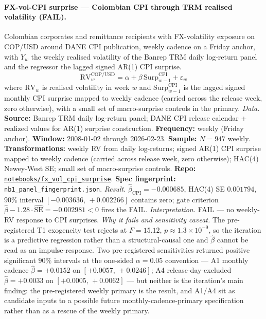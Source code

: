 \paragraph{FX-vol-CPI surprise --- Colombian CPI through TRM realised volatility (FAIL).}
Colombian corporates and remittance recipients with FX-volatility exposure on COP/USD around DANE CPI publication, weekly cadence on a Friday anchor, with \(Y_w\) the weekly realised volatility of the Banrep TRM daily log-return panel and the regressor the lagged signed AR(1) CPI surprise.
\[ \mathrm{RV}^{\mathrm{COP/USD}}_w = \alpha + \beta\, \mathrm{Surp}^{\mathrm{CPI}}_{w-1} + \varepsilon_w \]
where \(\mathrm{RV}_w\) is realised volatility in week \(w\) and \(\mathrm{Surp}^{\mathrm{CPI}}_{w-1}\) is the lagged signed monthly CPI surprise mapped to weekly cadence (carried across the release week, zero otherwise), with a small set of macro-surprise controls in the primary.
\textit{Data.} \textbf{Source:} Banrep TRM daily log-return panel; DANE CPI release calendar + realized values for AR(1) surprise construction. \textbf{Frequency:} weekly (Friday anchor). \textbf{Window:} 2008-01-02 through 2026-02-23. \textbf{Sample:} \(N = 947\) weekly. \textbf{Transformations:} weekly RV from daily log-returns; signed AR(1) CPI surprise mapped to weekly cadence (carried across release week, zero otherwise); HAC(4) Newey-West SE; small set of macro-surprise controls. \textbf{Repo:} \href{https://github.com/JMSBPP/abrigo-analytics/tree/master/notebooks/fx_vol_cpi_surprise}{\texttt{notebooks/fx\_vol\_cpi\_surprise}}. \textbf{Spec fingerprint:} \texttt{nb1\_panel\_fingerprint.json}.
\textit{Result.} \(\hat{\beta}_{\mathrm{CPI}} = -0.000685\), HAC(4) SE \(0.001794\), \(90\%\) interval \([-0.003636,\, +0.002266]\) contains zero; gate criterion \(\hat{\beta} - 1.28 \cdot \widehat{\mathrm{SE}} = -0.002981 < 0\) fires the FAIL.
\textit{Interpretation.} FAIL --- no weekly-RV response to CPI surprises.
\textit{Why it fails and sensitivity caveat.} The pre-registered T1 exogeneity test rejects at \(F = 15.12\), \(p \approx 1.3 \times 10^{-9}\), so the iteration is a predictive regression rather than a structural-causal one and \(\hat{\beta}\) cannot be read as an impulse-response. Two pre-registered sensitivities returned positive significant \(90\%\) intervals at the one-sided \(\alpha = 0.05\) convention --- A1 monthly cadence \(\hat{\beta} = +0.0152\) on \([+0.0057,\, +0.0246]\); A4 release-day-excluded \(\hat{\beta} = +0.0033\) on \([+0.0005,\, +0.0062]\) --- but neither is the iteration's main finding: the pre-registered weekly primary is the result, and A1/A4 sit as candidate inputs to a possible future monthly-cadence-primary specification rather than as a rescue of the weekly primary.


